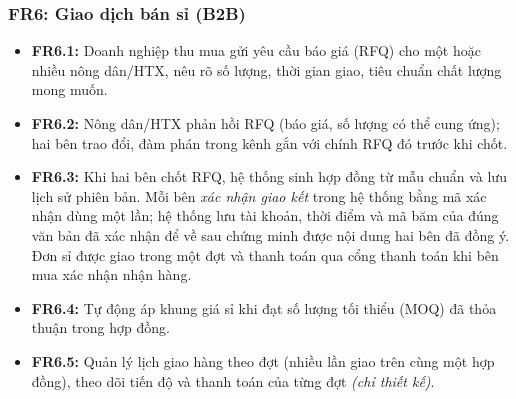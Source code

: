 \subsubsection*{FR6: Giao dịch bán sỉ (B2B)}
\begin{itemize}
    \item \textbf{FR6.1:} Doanh nghiệp thu mua gửi yêu cầu báo giá (RFQ) cho
    một hoặc nhiều nông dân/HTX, nêu rõ số lượng, thời gian giao, tiêu chuẩn
    chất lượng mong muốn.
    \item \textbf{FR6.2:} Nông dân/HTX phản hồi RFQ (báo giá, số lượng có
    thể cung ứng); hai bên trao đổi, đàm phán trong kênh gắn với chính RFQ đó
    trước khi chốt.
    \item \textbf{FR6.3:} Khi hai bên chốt RFQ, hệ thống sinh hợp đồng từ
    mẫu chuẩn và lưu lịch sử phiên bản. Mỗi bên \emph{xác nhận giao kết} trong
    hệ thống bằng mã xác nhận dùng một lần; hệ thống lưu tài khoản, thời điểm
    và mã băm của đúng văn bản đã xác nhận để về sau chứng minh được nội dung
    hai bên đã đồng ý. Đơn sỉ được giao trong một đợt và thanh toán qua cổng
    thanh toán khi bên mua xác nhận nhận hàng.
    \item \textbf{FR6.4:} Tự động áp khung giá sỉ khi đạt số lượng tối
    thiểu (MOQ) đã thỏa thuận trong hợp đồng.
    \item \textbf{FR6.5:} Quản lý lịch giao hàng theo đợt (nhiều lần giao
    trên cùng một hợp đồng), theo dõi tiến độ và thanh toán của từng đợt
    \emph{(chỉ thiết kế)}.
\end{itemize}

